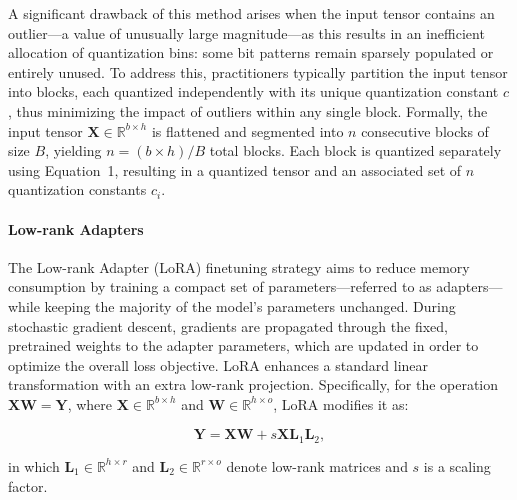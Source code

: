 A significant drawback of this method arises when the input tensor contains an outlier—a value of unusually large magnitude—as this results in an inefficient allocation of quantization bins: some bit patterns remain sparsely populated or entirely unused. To address this, practitioners typically partition the input tensor into blocks, each quantized independently with its unique quantization constant $c$, thus minimizing the impact of outliers within any single block. Formally, the input tensor $\mathbf{X}\in \mathbb{R}^{b\times h}$ is flattened and segmented into $n$ consecutive blocks of size $B$, yielding ${n = ({b\times h} )/{B} }$ total blocks. Each block is quantized separately using Equation~1, resulting in a quantized tensor and an associated set of $n$ quantization constants $c_i$.

\paragraph{Low-rank Adapters} The Low-rank Adapter (LoRA) finetuning strategy \citep{hu2021lora} aims to reduce memory consumption by training a compact set of parameters—referred to as adapters—while keeping the majority of the model’s parameters unchanged. During stochastic gradient descent, gradients are propagated through the fixed, pretrained weights to the adapter parameters, which are updated in order to optimize the overall loss objective. LoRA enhances a standard linear transformation with an extra low-rank projection. Specifically, for the operation ${\mathbf{X} \mathbf{W} = \mathbf{Y}}$, where $\mathbf{X}\in  \mathbb{R}^{b\times h}$ and $\mathbf{W}\in  \mathbb{R}^{h\times o}$, LoRA modifies it as:

\begin{equation}
    \mathbf{Y} = \mathbf{X}\mathbf{W} + s\mathbf{X}\mathbf{L}_1\mathbf{L}_2,
\end{equation}

in which $\mathbf{L}_1\in  \mathbb{R}^{h\times r}$ and $\mathbf{L}_2\in  \mathbb{R}^{r\times o}$ denote low-rank matrices and $s$ is a scaling factor.

